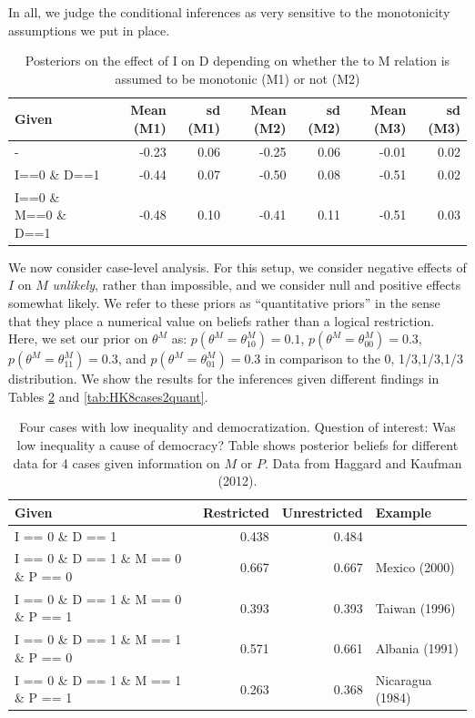 \documentclass[
  12pt,
]{book}
\begin{document}
In all, we judge the conditional inferences as very sensitive to the monotonicity assumptions we put in place.

\begin{table}

\caption{\label{tab:15pimdgraphs}Posteriors on the effect of I on D depending on whether the to M relation is assumed to be monotonic (M1) or not (M2)}
\centering
\begin{tabular}[t]{l|r|r|r|r|r|r}
\hline
Given & Mean (M1) & sd (M1) & Mean (M2) & sd (M2) & Mean (M3) & sd (M3)\\
\hline
- & -0.23 & 0.06 & -0.25 & 0.06 & -0.01 & 0.02\\
\hline
I==0 \& D==1 & -0.44 & 0.07 & -0.50 & 0.08 & -0.51 & 0.02\\
\hline
I==0 \& M==0 \& D==1 & -0.48 & 0.10 & -0.41 & 0.11 & -0.51 & 0.03\\
\hline
\end{tabular}
\end{table}

We now consider case-level analysis. For this setup, we consider negative effects of \(I\) on \(M\) \emph{unlikely}, rather than impossible, and we consider null and positive effects somewhat likely. We refer to these priors as ``quantitative priors'' in the sense that they place a numerical value on beliefs rather than a logical restriction. Here, we set our prior on \(\theta^M\) as: \(p(\theta^M=\theta^M_{10})=0.1\), \(p(\theta^M=\theta^M_{00})=0.3\), \(p(\theta^M=\theta^M_{11})=0.3\), and \(p(\theta^M=\theta^M_{01})=0.3\) in comparison to the 0, 1/3,1/3,1/3 distribution. We show the results for the inferences given different findings in Tables \ref{tab:HK8cases1quant} and \ref{tab:HK8cases2quant}.

\begin{table}

\caption{\label{tab:HK8cases1quant}\label{tab:HK8cases1quant} Four cases with low inequality and  democratization. Question of interest: Was low inequality a cause of democracy? Table shows posterior beliefs for different data for 4 cases given information on $M$ or $P$. Data from Haggard and Kaufman (2012).}
\centering
\begin{tabular}[t]{l|r|r|l}
\hline
Given & Restricted & Unrestricted & Example\\
\hline
I == 0  \& D ==  1 & 0.438 & 0.484 & \\
\hline
I == 0  \& D ==  1 \& M == 0 \& P == 0 & 0.667 & 0.667 & Mexico (2000)\\
\hline
I == 0  \& D ==  1 \& M == 0 \& P == 1 & 0.393 & 0.393 & Taiwan (1996)\\
\hline
I == 0  \& D ==  1 \& M == 1 \& P == 0 & 0.571 & 0.661 & Albania (1991)\\
\hline
I == 0  \& D ==  1 \& M == 1 \& P == 1 & 0.263 & 0.368 & Nicaragua (1984)\\
\hline
\end{tabular}
\end{table}
\end{document}
